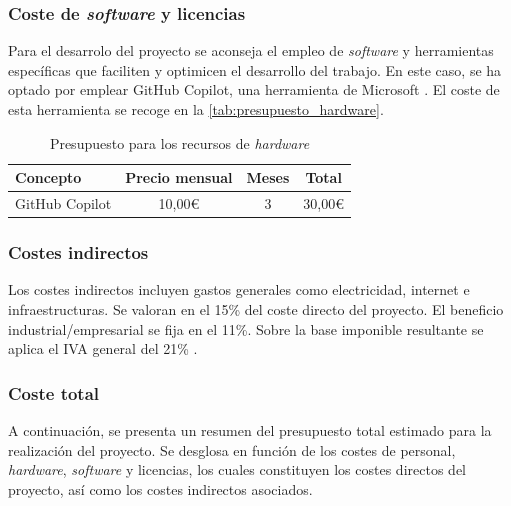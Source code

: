 \documentclass[12pt,a4paper,onecolumn,oneside]{report}
\begin{document}
\subsubsection{Coste de \textit{software} y licencias}
\label{Coste de software y licencias}

Para el desarrolo del proyecto se aconseja el empleo de \textit{software} y herramientas específicas que faciliten
y optimicen el desarrollo del trabajo. En este caso, se ha optado por emplear GitHub Copilot, una herramienta
de Microsoft \cite{github_copilot}. El coste de esta herramienta se recoge en la \autoref{tab:presupuesto_hardware}.

\begin{table}[H]
\caption{Presupuesto para los recursos de \textit{hardware}}
\label{tab:presupuesto_hardware}
\centering
\renewcommand{\arraystretch}{1.2}
\begin{tabular}{lccc}
\hline
\textbf{Concepto} & \textbf{Precio mensual} & \textbf{Meses} & \textbf{Total} \\
\hline
GitHub Copilot & 10,00\euro{} & 3 & 30,00\euro{} \\

\hline
\end{tabular}

\end{table}

\subsubsection{Costes indirectos}
Los costes indirectos incluyen gastos generales como electricidad, internet e infraestructuras.
Se valoran en el 15\% del coste directo del proyecto. El beneficio industrial/empresarial se fija 
en el 11\%. Sobre la base imponible resultante se aplica el IVA general del 21\% \cite{AEAT_IVA2025}.

\subsubsection{Coste total}
A continuación, se presenta un resumen del presupuesto total estimado para la realización del proyecto. 
Se desglosa en función de los costes de personal, \textit{hardware}, \textit{software} y licencias, los cuales constituyen
los costes directos del proyecto, así como los costes indirectos asociados.
\end{document}
